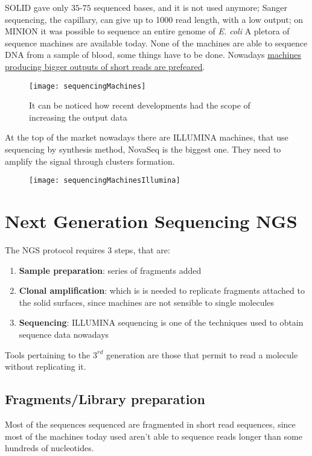 SOLID gave only $35$-$75$ sequenced bases, and it is not used anymore; Sanger sequencing, the capillary, can give up to 1000 read length, with a low output; on MINION it was possible to sequence an entire genome of \textit{E. coli}
A pletora of sequence machines are available today. None of the machines are able to sequence DNA from a sample of blood, some things have to be done. Nowadays \underline{machines producing bigger outputs of short reads are prefeared}.

\begin{figure}[H]
\caption{It can be noticed how recent developments had the scope of increasing the output data}
\centering
\texttt{[image: sequencingMachines]}
\label{}
\end{figure}

At the top of the market nowadays there are ILLUMINA machines, that use sequencing by synthesis method, NovaSeq is the biggest one. They need to amplify the signal through clusters formation.

\begin{figure}[H]
\caption{}
\centering
\texttt{[image: sequencingMachinesIllumina]}
\label{}
\end{figure}

\section{Next Generation Sequencing NGS}

The NGS protocol requires $3$ steps, that are:

\begin{enumerate}
	\item \textbf{Sample preparation}: series of fragments added
	\item \textbf{Clonal amplification}: which is is needed to replicate fragments attached to the solid surfaces, since machines are not sensible to single molecules
	\item \textbf{Sequencing}: ILLUMINA sequencing is one of the techniques used to obtain sequence data nowadays
\end{enumerate}

Tools pertaining to the $3^{rd}$ generation are those that permit to read a molecule without replicating it.

\subsection{Fragments/Library preparation}
Most of the sequences sequenced are fragmented in short read sequences, since most of the machines today used aren't able to sequence reads longer than some hundreds of nucleotides.

